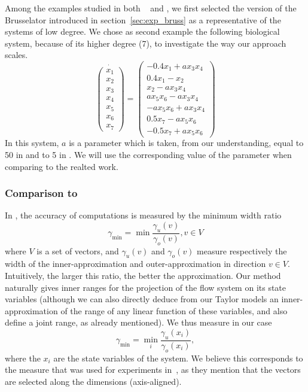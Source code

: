 Among the examples studied in both ~\cite{Underapproxflowpipes} and \cite{underapprox16}, we first selected
the version of the Brusselator introduced in section~\ref{sec:exp_bruss} as a representative of the systems of low degree. 
We chose as second example the following biological system, because of its higher degree (7), to investigate the way our approach scales. 
\begin{equation}
\dot{\left(\begin{array}{c}
x_1 \\
x_2 \\
x_3 \\
x_4 \\
x_5 \\
x_6 \\
x_7
\end{array}\right)} = \left(\begin{array}{c}
-0.4x_1+ a x_3x_4 \\
0.4x_1-x_2 \\
x_2- a x_3x_4 \\
a x_5x_6- a x_3x_4 \\
- a x_5x_6+ a x_3x_4 \\
0.5x_7- a x_5x_6 \\
-0.5x_7+ a x_5x_6
\end{array}\right)
\end{equation}
In this system, $a$ is a parameter which is taken, from our understanding, equal to 50 in \cite{Underapproxflowpipes} and to 5 in \cite{underapprox16}. 
We will use the corresponding value of the parameter when comparing to the realted work.

\subsubsection{Comparison to \cite{Underapproxflowpipes}}
In  \cite{Underapproxflowpipes}, the  accuracy of computations is measured by the minimum width ratio 
\[ \gamma_{\min}=\min{\frac{\gamma_u(v)}{\gamma_o(v)}}, v \in V \]
where $V$ is a set of vectors, and $\gamma_u(v)$ and $\gamma_o(v)$ measure respectively the width of the inner-approximation and outer-approximation
in direction $v \in V$. 
Intuitively, the larger this ratio, the better the approximation. 
Our method naturally gives inner ranges for the projection of the flow system on its state variables (although we can also directly deduce from our Taylor models 
an inner-approximation of the range of any linear function of these variables, and also define a joint range, as 
already mentioned).
We thus measure in our case \[ \gamma_{\min}=\min_{i}{\frac{\gamma_u(x_i)}{\gamma_o(x_i)}}, \]
where the $x_i$ are the state variables of the system. We believe this corresponds to the measure that was used for experiments 
in~\cite{Underapproxflowpipes}, as they mention that the vectors are selected along the dimensions (axis-aligned).

